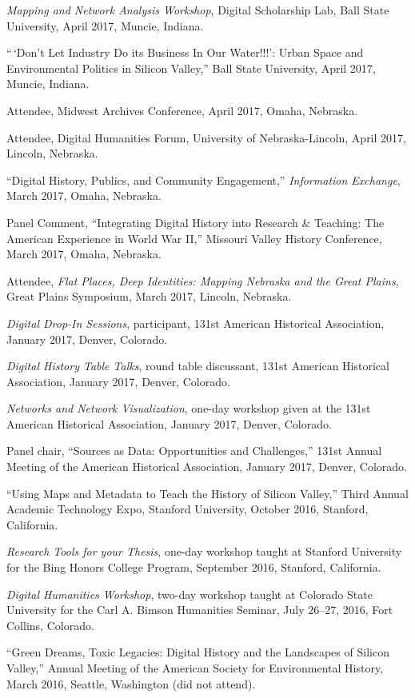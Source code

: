 \emph{Mapping and Network Analysis Workshop}, Digital Scholarship Lab,
Ball State University, April 2017, Muncie, Indiana.

``\,`Don't Let Industry Do its Business In Our Water!!!': Urban Space
and Environmental Politics in Silicon Valley,'' Ball State University,
April 2017, Muncie, Indiana.

Attendee, Midwest Archives Conference, April 2017, Omaha, Nebraska.

Attendee, Digital Humanities Forum, University of Nebraska-Lincoln,
April 2017, Lincoln, Nebraska.

``Digital History, Publics, and Community Engagement,''
\emph{Information Exchange}, March 2017, Omaha, Nebraska.

Panel Comment, ``Integrating Digital History into Research \& Teaching:
The American Experience in World War II,'' Missouri Valley History
Conference, March 2017, Omaha, Nebraska.

Attendee, \emph{Flat Places, Deep Identities: Mapping Nebraska and the
Great Plains}, Great Plains Symposium, March 2017, Lincoln, Nebraska.

\emph{Digital Drop-In Sessions}, participant, 131st American Historical
Association, January 2017, Denver, Colorado.

\emph{Digital History Table Talks}, round table discussant, 131st
American Historical Association, January 2017, Denver, Colorado.

\emph{Networks and Network Visualization}, one-day workshop given at the
131st American Historical Association, January 2017, Denver, Colorado.

Panel chair, ``Sources as Data: Opportunities and Challenges,'' 131st
Annual Meeting of the American Historical Association, January 2017,
Denver, Colorado.

``Using Maps and Metadata to Teach the History of Silicon Valley,''
Third Annual Academic Technology Expo, Stanford University, October
2016, Stanford, California.

\emph{Research Tools for your Thesis}, one-day workshop taught at
Stanford University for the Bing Honors College Program, September 2016,
Stanford, California.

\emph{Digital Humanities Workshop}, two-day workshop taught at Colorado
State University for the Carl A. Bimson Humanities Seminar, July 26--27,
2016, Fort Collins, Colorado.

``Green Dreams, Toxic Legacies: Digital History and the Landscapes of
Silicon Valley,'' Annual Meeting of the American Society for
Environmental History, March 2016, Seattle, Washington (did not attend).

